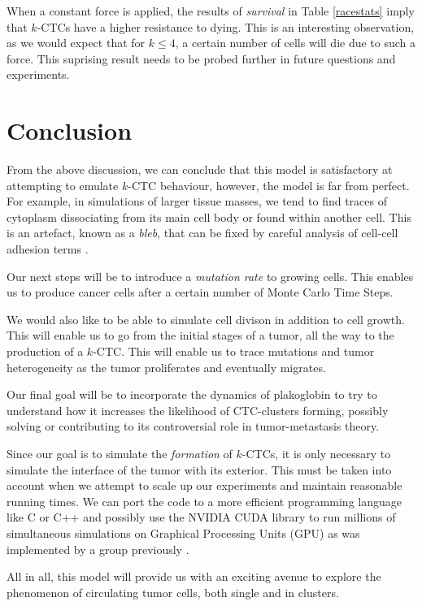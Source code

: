 \documentclass[12pt]{article}
\begin{document}
When a constant force is applied, the results of \emph{survival} in Table \ref{racestats} imply that $k$-CTCs have a higher resistance to dying. This is an interesting observation, as  we would expect that for $k\leq4$, a certain number of cells will die due to such a force. This suprising result needs to be probed further in future questions and experiments.

\section{Conclusion}

From the above discussion, we can conclude that this model is satisfactory at attempting to emulate $k$-CTC behaviour, however, the model is far from perfect. For example, in simulations of larger tissue masses, we tend to find traces of cytoplasm dissociating from its main cell body or found within another cell. This is an artefact, known as a \emph{bleb}, that can be fixed by careful analysis of cell-cell adhesion terms \cite{Glazier2007}.

Our next steps will be to introduce a \emph{mutation rate} to growing cells. This enables us to produce cancer cells after a certain number of Monte Carlo Time Steps.

We would also like to be able to simulate cell divison in addition to cell growth. This will enable us to go from the initial stages of a tumor, all the way to the production of a $k$-CTC. This will enable us to trace mutations and tumor heterogeneity as the tumor proliferates and eventually migrates.

Our final goal will be to incorporate the dynamics of plakoglobin to try to understand how it increases the likelihood of CTC-clusters forming, possibly solving or contributing to its controversial role in tumor-metastasis theory.

Since our goal is to simulate the \emph{formation} of $k$-CTCs, it is only necessary to simulate the interface of the tumor with its exterior. This must be taken into account when we attempt to scale up our experiments and maintain reasonable running times. We can port the code to a more efficient programming language like C or C++ and possibly use the NVIDIA CUDA library to run millions of simultaneous simulations on Graphical Processing Units (GPU) as was implemented by a group previously \cite{Tapia2011}. 

All in all, this model will provide us with an exciting avenue to explore the phenomenon of circulating tumor cells, both single and in clusters. 
\end{document}
